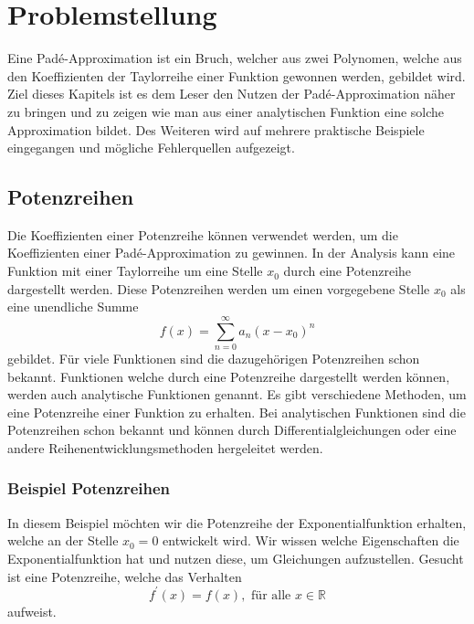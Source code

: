 %
%
%

\section{Problemstellung
\label{pade:section:Problemstellung}}
Eine Padé-Approximation ist ein Bruch, welcher aus zwei Polynomen, welche aus den Koeffizienten der Taylorreihe einer Funktion gewonnen werden, gebildet wird. 
Ziel dieses Kapitels ist es dem Leser den Nutzen der Padé-Approximation näher zu bringen und zu zeigen wie man aus einer analytischen Funktion eine solche Approximation bildet.
Des Weiteren wird auf mehrere praktische Beispiele eingegangen und mögliche Fehlerquellen aufgezeigt. 



\subsection{Potenzreihen
\label{pade:subsection:Potenzreihen}}
Die Koeffizienten einer Potenzreihe können verwendet werden, um die Koeffizienten einer Padé-Approximation zu gewinnen. 
In der Analysis kann eine Funktion mit einer Taylorreihe um eine Stelle $x_{0}$ durch eine Potenzreihe dargestellt werden. 
Diese Potenzreihen werden um einen vorgegebene Stelle $x_{0}$ als eine unendliche Summe 
\begin{equation}
f(x)=\sum_{n=0}^{\infty} a_{n} (x-x_{0})^{n} 
\label{pade:expofunk}
\end{equation}
gebildet.
Für viele Funktionen sind die dazugehörigen Potenzreihen schon bekannt. 
Funktionen welche durch eine Potenzreihe dargestellt werden können, werden auch analytische Funktionen genannt.
Es gibt verschiedene Methoden, um eine Potenzreihe einer Funktion zu erhalten. 
Bei analytischen Funktionen sind die Potenzreihen schon bekannt und können durch Differentialgleichungen oder eine andere Reihenentwicklungsmethoden hergeleitet werden.

\subsubsection{Beispiel Potenzreihen
\label{pade:section:Bsp_Potenzreihen}}
In diesem Beispiel möchten wir die Potenzreihe der Exponentialfunktion erhalten, welche an der Stelle $x_0 = 0$ entwickelt wird. 
Wir wissen welche Eigenschaften die Exponentialfunktion hat und nutzen diese, um Gleichungen aufzustellen. 
Gesucht ist eine Potenzreihe, welche das Verhalten 
\begin{equation*}
	f^{\prime}(x) = f(x) , \text{ für alle } x \in \mathbb{R} 
\end{equation*}
aufweist.

